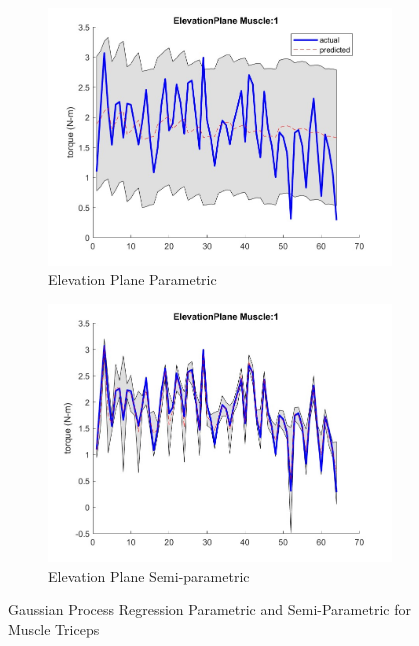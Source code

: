 \begin{figure}[htbp]
    \begin{subfigure}[b]{0.45\linewidth}
        \includegraphics[height=0.15\textheight]{Pictures/Results/GPR/ElevationPlane_1Parametric.jpg}
        \caption{Elevation Plane Parametric}
    \end{subfigure}
    \hfill
    \begin{subfigure}[b]{0.45\linewidth}
        \includegraphics[height=0.15\textheight]{Pictures/Results/GPR/ElevationPlane_1Semiparametric.jpg}
        \caption{Elevation Plane Semi-parametric}
    \end{subfigure}
    
    \caption{Gaussian Process Regression Parametric and Semi-Parametric for Muscle Triceps}
    \label{fig:GPRMuscleTriceps}

\end{figure}